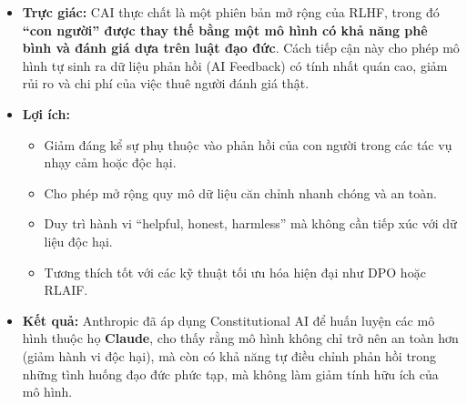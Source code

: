 \begin{itemize}
\begin{enumerate}
        \item \textbf{Giai đoạn Sửa đổi (Revision):}  
        Tiếp theo, mô hình được yêu cầu viết lại câu trả lời, sử dụng đoạn phê bình ở trên làm hướng dẫn, ví dụ:
        \begin{quote}
            ``Hãy viết lại câu trả lời sao cho nó tuân thủ các nguyên tắc trong hiến pháp, dựa trên những phê bình vừa nêu.'' 
        \end{quote}
        Kết quả là ta thu được một cặp câu trả lời: câu gốc $y_{\text{original}}$ và câu đã chỉnh sửa $y_{\text{revised}}$.

        \item \textbf{Giai đoạn Huấn luyện:}  
        Cặp dữ liệu $(x, y_{\text{revised}}, y_{\text{original}})$ được xem như một cặp sở thích (revised $>$ original).  
        Tập dữ liệu này có thể được sử dụng:
        \begin{itemize}
            \item để huấn luyện một \textbf{Reward Model} như trong RLHF, hoặc
            \item để \textbf{tinh chỉnh trực tiếp bằng DPO}, với $y_{\text{revised}}$ là phản hồi được ưa thích hơn.
        \end{itemize}
    \end{enumerate}

    \item \textbf{Trực giác:}  
    CAI thực chất là một phiên bản mở rộng của RLHF, trong đó \textbf{“con người” được thay thế bằng một mô hình có khả năng phê bình và đánh giá dựa trên luật đạo đức}.  
    Cách tiếp cận này cho phép mô hình tự sinh ra dữ liệu phản hồi (AI Feedback) có tính nhất quán cao, giảm rủi ro và chi phí của việc thuê người đánh giá thật.

    \item \textbf{Lợi ích:}
    \begin{itemize}
        \item Giảm đáng kể sự phụ thuộc vào phản hồi của con người trong các tác vụ nhạy cảm hoặc độc hại.
        \item Cho phép mở rộng quy mô dữ liệu căn chỉnh nhanh chóng và an toàn.
        \item Duy trì hành vi “helpful, honest, harmless” mà không cần tiếp xúc với dữ liệu độc hại.
        \item Tương thích tốt với các kỹ thuật tối ưu hóa hiện đại như DPO hoặc RLAIF.
    \end{itemize}

    \item \textbf{Kết quả:}  
    Anthropic đã áp dụng Constitutional AI để huấn luyện các mô hình thuộc họ \textbf{Claude}, cho thấy rằng mô hình không chỉ trở nên an toàn hơn (giảm hành vi độc hại), mà còn có khả năng tự điều chỉnh phản hồi trong những tình huống đạo đức phức tạp, mà không làm giảm tính hữu ích của mô hình.
\end{itemize}

